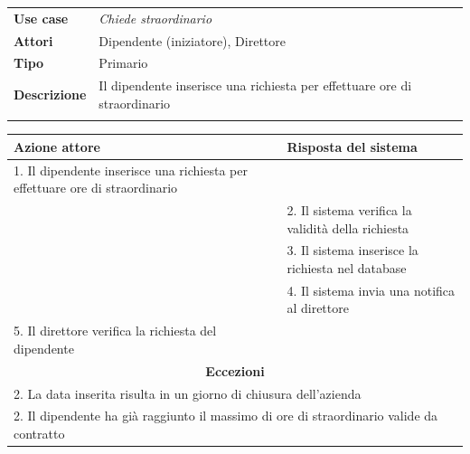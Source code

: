 \documentclass{scrreprt}
\begin{document}

	\FloatBarrier
	\begin{table}[h|]
	\centering
	\begin{tabular}{p{3cm}p{11cm}}
	\textbf{Use case} & \textit{Chiede straordinario} \\ 
	\textbf{Attori} & Dipendente (iniziatore), Direttore \\ 
	\textbf{Tipo} & Primario \\ 
	\textbf{Descrizione} & Il dipendente inserisce una richiesta per effettuare ore di straordinario \\
	\\
	\end{tabular}
	\centering
	\begin{tabular}{|p{7cm}|p{7cm}|}
	\hline
	\textbf{Azione attore} & \textbf{Risposta del sistema} \\ \hline
	1. Il dipendente inserisce una richiesta per effettuare ore di straordinario &                  \\ \hline
	& 2. Il sistema verifica la validità della richiesta                  \\ \hline
	& 3. Il sistema inserisce la richiesta nel database                  \\ \hline
	& 4. Il sistema invia una notifica al direttore                  \\ \hline
	5. Il direttore verifica la richiesta del dipendente &                   \\ \hline
	\multicolumn{2}{|c|}{\textbf{Eccezioni}} \\ \hline
	\multicolumn{2}{|l|}{ 2. La data inserita risulta in un giorno di chiusura dell'azienda } \\ \hline
	\multicolumn{2}{|l|}{ 2. Il dipendente ha già raggiunto il massimo di ore di straordinario valide da contratto } \\ \hline
	\end{tabular}
	\end{table}
	\FloatBarrier
	
	
\end{document}
